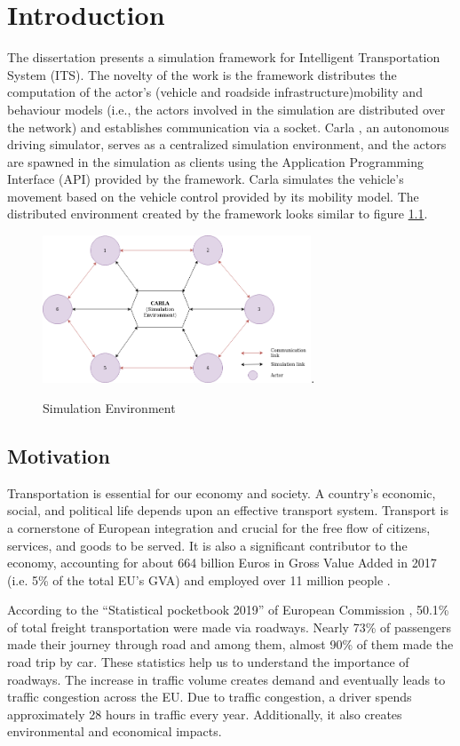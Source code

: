 \chapter{Introduction}
The dissertation presents a simulation framework for Intelligent Transportation System (ITS). The novelty of the work is the framework distributes the computation of the actor's (vehicle and roadside infrastructure)mobility and behaviour models (i.e., the actors involved in the simulation are distributed over the network) and establishes communication via a socket. Carla \cite{carla}, an autonomous driving simulator, serves as a centralized simulation environment, and the actors are spawned in the simulation as clients using the Application Programming Interface (API) provided by the framework. Carla simulates the vehicle's movement based on the vehicle control provided by its mobility model. The distributed environment created by the framework looks similar to figure \ref{fig:my_label}.

\begin{figure}[h!]
    \centering
    \includegraphics[width=8cm]{Framework/Images/Arc1.png}.
    \caption{Simulation Environment}
    \label{fig:my_label}
\end{figure}

\section{Motivation}
Transportation is essential for our economy and society. A country's economic, social, and political life depends upon an effective transport system. Transport is a cornerstone of European integration and crucial for the free flow of citizens, services, and goods to be served. It is also a significant contributor to the economy, accounting for about 664 billion Euros in Gross Value Added in 2017 (i.e. 5\% of the total EU's GVA) and employed over 11 million people \cite{001}. 

According to the “Statistical pocketbook 2019” of European Commission \cite{001}, 50.1\% of total freight transportation were made via roadways. Nearly 73\% of passengers made their journey through road and among them, almost 90\% of them made the road trip by car. These statistics help us to understand the importance of roadways. The increase in traffic volume creates demand and eventually leads to traffic congestion across the EU. Due to traffic congestion, a driver spends approximately 28 hours in traffic every year. Additionally, it also creates environmental and economical impacts.

